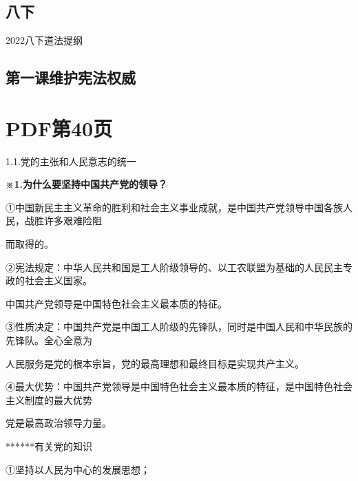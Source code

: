 \documentclass[lang=cn,11pt]{elegantbook}
\newcommand{\daofasym}[1]{{\daofasymbolfont #1}}
\newcommand{\daofasym}[1]{#1}
\begin{document}
\subsection*{八下}

2022八下道法提纲\par

\subsection*{第一课维护宪法权威}


\section*{PDF第40页}

1.1.党的主张和人民意志的统一\par

\textbf{※1.为什么要坚持中国共产党的领导？}\par

\daofasym{①}中国新民主主义革命的胜利和社会主义事业成就，是中国共产党领导中国各族人民，战胜许多艰难险阻\par

而取得的。\par

\daofasym{②}宪法规定：中华人民共和国是工人阶级领导的、以工农联盟为基础的人民民主专政的社会主义国家。\par

中国共产党领导是中国特色社会主义最本质的特征。\par

\daofasym{③}性质决定：中国共产党是中国工人阶级的先锋队，同时是中国人民和中华民族的先锋队。全心全意为\par

人民服务是党的根本宗旨，党的最高理想和最终目标是实现共产主义。\par

\daofasym{④}最大优势：中国共产党领导是中国特色社会主义最本质的特征，是中国特色社会主义制度的最大优势\par

党是最高政治领导力量。\par

******有关党的知识\par

\daofasym{①}坚持以人民为中心的发展思想；\par
\end{document}
